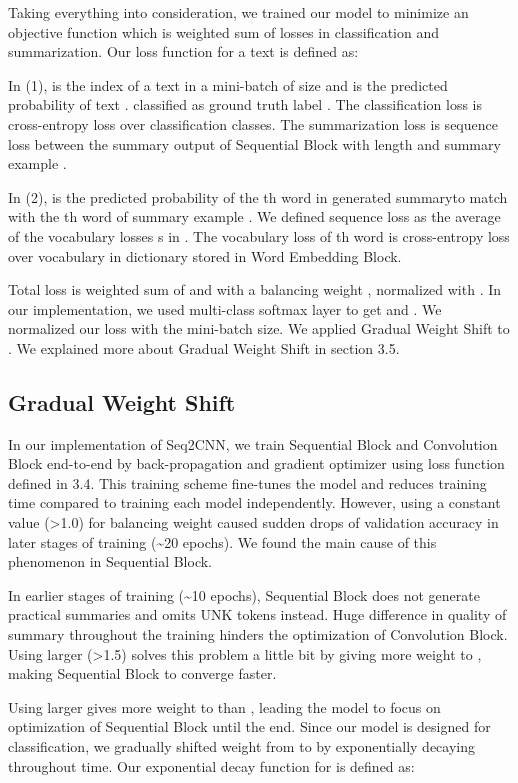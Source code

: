 \documentclass{article}
\begin{document}
Taking everything into consideration, we trained our model to minimize an objective function which is weighted sum of losses in classification and summarization. Our loss function for a text is defined as: 



In (1),  is the index of a text in a mini-batch of size  and  is the predicted probability of text . classified as ground truth label . The classification loss  is cross-entropy loss over classification classes. The summarization loss  is sequence loss between the summary output of Sequential Block  with length  and summary example . 

In (2),  is the predicted probability of the th word  in generated summaryto match with the th word of summary example . We defined sequence loss as the average of the vocabulary losses s in . The vocabulary loss of th word  is cross-entropy loss over vocabulary in dictionary stored in Word Embedding Block. 

Total loss is weighted sum of  and  with a balancing weight , normalized with . In our implementation, we used multi-class softmax layer to get  and . We normalized our loss with the mini-batch size. We applied Gradual Weight Shift to . We explained more about Gradual Weight Shift in section 3.5. 

\subsection{Gradual Weight Shift}
In our implementation of Seq2CNN, we train Sequential Block and Convolution Block end-to-end by back-propagation and gradient optimizer using loss function defined in 3.4. This training scheme fine-tunes the model and reduces training time compared to training each model independently. However, using a constant value (\textgreater1.0) for balancing weight  caused sudden drops of validation accuracy in later stages of training (\textasciitilde20 epochs). We found the main cause of this phenomenon in Sequential Block.

In earlier stages of training (\textasciitilde10 epochs), Sequential Block does not generate practical summaries and omits UNK tokens instead. Huge difference in quality of summary throughout the training hinders the optimization of Convolution Block. Using larger  (\textgreater1.5) solves this problem a little bit by giving more weight to , making Sequential Block to converge faster.

Using larger  gives more weight to  than , leading the model to focus on optimization of Sequential Block until the end. Since our model is designed for classification, we gradually shifted weight from  to  by exponentially decaying  throughout time. 
Our exponential decay function for  is defined as:
\end{document}
